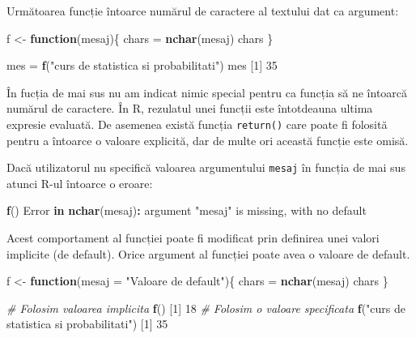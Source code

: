 \documentclass[]{article}
\newenvironment{Shaded}{\begin{snugshade}}{\end{snugshade}}
\newcommand{\KeywordTok}[1]{\textcolor[rgb]{0.13,0.29,0.53}{\textbf{#1}}}
\newcommand{\DataTypeTok}[1]{\textcolor[rgb]{0.13,0.29,0.53}{#1}}
\newcommand{\DecValTok}[1]{\textcolor[rgb]{0.00,0.00,0.81}{#1}}
\newcommand{\StringTok}[1]{\textcolor[rgb]{0.31,0.60,0.02}{#1}}
\newcommand{\CommentTok}[1]{\textcolor[rgb]{0.56,0.35,0.01}{\textit{#1}}}
\newcommand{\ControlFlowTok}[1]{\textcolor[rgb]{0.13,0.29,0.53}{\textbf{#1}}}
\newcommand{\OperatorTok}[1]{\textcolor[rgb]{0.81,0.36,0.00}{\textbf{#1}}}
\newcommand{\NormalTok}[1]{#1}
\begin{document}
Următoarea funcție întoarce numărul de caractere al textului dat ca
argument:

\begin{Shaded}
\begin{Highlighting}[]
\NormalTok{f <-}\StringTok{ }\ControlFlowTok{function}\NormalTok{(mesaj)\{}
\NormalTok{  chars =}\StringTok{ }\KeywordTok{nchar}\NormalTok{(mesaj)}
\NormalTok{  chars}
\NormalTok{\}}

\NormalTok{mes =}\StringTok{ }\KeywordTok{f}\NormalTok{(}\StringTok{"curs de statistica si probabilitati"}\NormalTok{)}
\NormalTok{mes}
\NormalTok{[}\DecValTok{1}\NormalTok{] }\DecValTok{35}
\end{Highlighting}
\end{Shaded}

În fucția de mai sus nu am indicat nimic special pentru ca funcția să ne
întoarcă numărul de caractere. În R, rezulatul unei funcții este
întotdeauna ultima expresie evaluată. De asemenea există funcția
\texttt{return()} care poate fi folosită pentru a întoarce o valoare
explicită, dar de multe ori această funcție este omisă.

Dacă utilizatorul nu specifică valoarea argumentului \texttt{mesaj} în
funcția de mai sus atunci R-ul întoarce o eroare:

\begin{Shaded}
\begin{Highlighting}[]
\KeywordTok{f}\NormalTok{()}
\NormalTok{Error }\ControlFlowTok{in} \KeywordTok{nchar}\NormalTok{(mesaj)}\OperatorTok{:}\StringTok{ }\NormalTok{argument }\StringTok{"mesaj"}\NormalTok{ is missing, with no default}
\end{Highlighting}
\end{Shaded}

Acest comportament al funcției poate fi modificat prin definirea unei
valori implicite (de default). Orice argument al funcției poate avea o
valoare de default.

\begin{Shaded}
\begin{Highlighting}[]
\NormalTok{f <-}\StringTok{ }\ControlFlowTok{function}\NormalTok{(}\DataTypeTok{mesaj =} \StringTok{"Valoare de default"}\NormalTok{)\{}
\NormalTok{  chars =}\StringTok{ }\KeywordTok{nchar}\NormalTok{(mesaj)}
\NormalTok{  chars}
\NormalTok{\}}

\CommentTok{# Folosim valoarea implicita }
\KeywordTok{f}\NormalTok{()}
\NormalTok{[}\DecValTok{1}\NormalTok{] }\DecValTok{18}
\CommentTok{# Folosim o valoare specificata}
\KeywordTok{f}\NormalTok{(}\StringTok{"curs de statistica si probabilitati"}\NormalTok{)}
\NormalTok{[}\DecValTok{1}\NormalTok{] }\DecValTok{35}
\end{Highlighting}
\end{Shaded}
\end{document}

